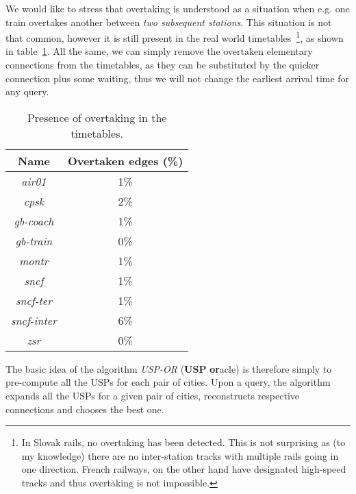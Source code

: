     \noindent We would like to stress that overtaking is understood as a situation when e.g. one train overtakes another between \textit{two subsequent stations}. This situation is not that common, however it is still present in the real world timetables~\footnote{In Slovak rails, no overtaking has been detected. This is not surprising as (to my knowledge) there are no inter-station tracks with multiple rails going in one direction. French railways, on the other hand have designated high-speed tracks and thus overtaking is not impossible.}, as shown in table~\ref{tab:overtake}. All the same, we can simply remove the overtaken elementary connections from the timetables, as they can be substituted by the quicker connection plus some waiting, thus we will not change the earliest arrival time for any query. \\
    
    \begin{table}[h!]
    	\centering
		\begin{tabular}{c|c}
            \rowcolor{tablehead}
        	\textbf{Name} & \textbf{Overtaken edges (\%)} \\
			\hline
			\textit{air01} & 1\% \\
			\textit{cpsk} & 2\% \\
			\textit{gb-coach} & 1\% \\
			\textit{gb-train} & 0\% \\
			\textit{montr} & 1\% \\
			\textit{sncf} & 1\% \\
			\textit{sncf-ter} & 1\% \\
			\textit{sncf-inter} & 6\% \\
			\textit{zsr} & 0\% \\
		\end{tabular}
		\caption{\label{tab:overtake} Presence of overtaking in the timetables.}
	\end{table}
	
	\noindent The basic idea of the algorithm \textit{USP-OR} (\textbf{USP} \textbf{or}acle) is therefore simply to pre-compute all the USPs for each pair of cities. Upon a query, the algorithm expands all the USPs for a given pair of cities, reconstructs respective connections and chooses the best one. \\
	
